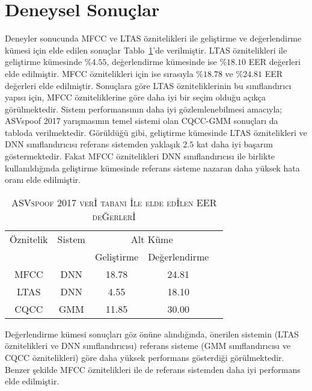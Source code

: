 \documentclass[conference, a4paper]{IEEEtran}
\begin{document}
\section{Deneysel Sonuçlar}
Deneyler sonucunda MFCC ve LTAS öznitelikleri ile geliştirme ve değerlendirme kümesi için elde edilen sonuçlar
Tablo~\ref{EHO}'de verilmiştir. LTAS öznitelikleri ile geliştirme kümesinde $\%4.55$, değerlendirme kümesinde ise
$\%18.10$ EER değerleri elde edilmiştir. MFCC öznitelikleri için ise sırasıyla $\%18.78$ ve $\%24.81$ EER değerleri
elde edilmiştir. Sonuçlara göre LTAS özniteliklerinin bu sınıflandırıcı yapısı için, MFCC özniteliklerine göre daha
iyi bir seçim olduğu açıkça görülmektedir. Sistem performansının daha iyi gözlemlenebilmesi amacıyla; ASVspoof 2017
yarışmasının temel sistemi olan CQCC-GMM \cite{kinnunen2017asvspoof,kinnunen2017asvspoof1} sonuçları da tabloda
verilmektedir. Görüldüğü gibi, geliştirme kümesinde LTAS öznitelikleri ve DNN sınıflandırıcısı referans sistemden
yaklaşık $2.5$ kat daha iyi başarım göstermektedir. Fakat MFCC öznitelikleri DNN sınıflandırıcısı ile birlikte
kullanıldığında geliştirme kümesinde referans sisteme nazaran daha yüksek hata oranı elde edilmiştir.

\begin{table}[ph]
    \centering
    \caption{\textsc{ASVspoof 2017 ver{\footnotesize  İ} tabanı {\footnotesize  İ}le elde ed{\footnotesize  İ}len EER
    de{\footnotesize  Ğ}erler{\footnotesize  İ}}}
    \label{EHO}
    \begin{tabular}{|c|c|cc|c|}
        \hline
        Öznitelik & Sistem & \multicolumn{2}{c|}{Alt Küme}                 \\
                  &        & Geliştirme                    & Değerlendirme \\
        \hline
        MFCC      & DNN    & 18.78                         & 24.81         \\
        LTAS      & DNN    & 4.55                          & 18.10         \\
        CQCC      & GMM    & 11.85                         & 30.00         \\
        \hline
    \end{tabular}
\end{table}

Değerlendirme kümesi sonuçları göz önüne alındığında, önerilen sistemin (LTAS öznitelikleri ve DNN sınıflandırıcısı)
referans sisteme (GMM sınıflandırıcısı ve CQCC öznitelikleri) göre daha yüksek performans gösterdiği görülmektedir.
Benzer şekilde MFCC öznitelikleri ile de referans sistemden daha iyi performans elde edilmiştir.
\end{document}
